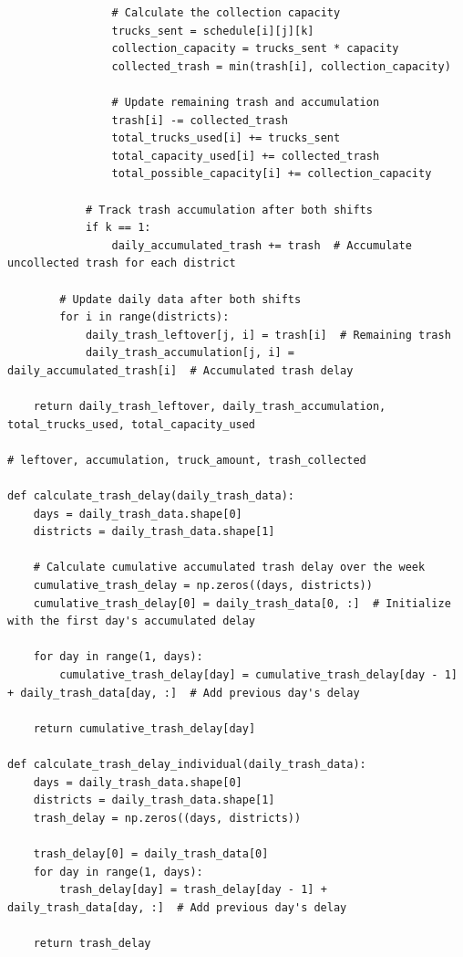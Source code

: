 \documentclass{article}
\begin{document}
\begin{verbatim}
                # Calculate the collection capacity
                trucks_sent = schedule[i][j][k]
                collection_capacity = trucks_sent * capacity
                collected_trash = min(trash[i], collection_capacity)
                
                # Update remaining trash and accumulation
                trash[i] -= collected_trash
                total_trucks_used[i] += trucks_sent
                total_capacity_used[i] += collected_trash
                total_possible_capacity[i] += collection_capacity
                
            # Track trash accumulation after both shifts
            if k == 1:
                daily_accumulated_trash += trash  # Accumulate uncollected trash for each district

        # Update daily data after both shifts
        for i in range(districts):
            daily_trash_leftover[j, i] = trash[i]  # Remaining trash
            daily_trash_accumulation[j, i] = daily_accumulated_trash[i]  # Accumulated trash delay

    return daily_trash_leftover, daily_trash_accumulation, total_trucks_used, total_capacity_used

# leftover, accumulation, truck_amount, trash_collected

def calculate_trash_delay(daily_trash_data):
    days = daily_trash_data.shape[0]
    districts = daily_trash_data.shape[1]
    
    # Calculate cumulative accumulated trash delay over the week
    cumulative_trash_delay = np.zeros((days, districts))
    cumulative_trash_delay[0] = daily_trash_data[0, :]  # Initialize with the first day's accumulated delay
    
    for day in range(1, days):
        cumulative_trash_delay[day] = cumulative_trash_delay[day - 1] + daily_trash_data[day, :]  # Add previous day's delay
    
    return cumulative_trash_delay[day]

def calculate_trash_delay_individual(daily_trash_data):
    days = daily_trash_data.shape[0]
    districts = daily_trash_data.shape[1]
    trash_delay = np.zeros((days, districts))

    trash_delay[0] = daily_trash_data[0]
    for day in range(1, days):
        trash_delay[day] = trash_delay[day - 1] + daily_trash_data[day, :]  # Add previous day's delay
    
    return trash_delay



\end{verbatim}
\end{document}
